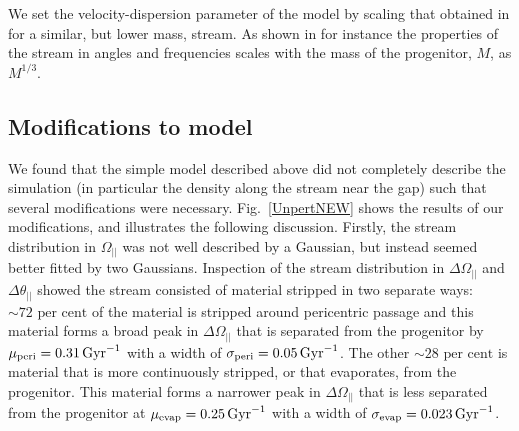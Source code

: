 \documentclass[useAMS,usenatbib,fleqn,a4paper]{mn2e}
\def\Gyr{\,{\rm Gyr}}
\def\percent{\text{ per cent}}
\def\percent{\text{ per cent}}
\begin{document}
We set the velocity-dispersion parameter of the model by scaling that obtained in \cite{Bovy2014} for a similar, but lower mass, stream. As shown in \cite{SandersBinney2013a} for instance the properties of the stream in angles and frequencies scales with the mass of the progenitor, $M$, as $M^{1/3}$.

\subsection{Modifications to model}\label{Sect::modelmods}
We found that the simple model described above did not completely describe the simulation (in particular the density along the stream near the gap) such that several modifications were necessary. Fig.~\ref{UnpertNEW} shows the results of our modifications, and illustrates the following discussion. Firstly, the stream distribution in $\Omega_{||}$ was not well described by a Gaussian, but instead seemed better fitted by two Gaussians. Inspection of the stream distribution in $\Delta\Omega_{||}$ and $\Delta\theta_{||}$ showed the stream consisted of material stripped in two separate ways: $\sim72\percent$ of the material is stripped around pericentric passage and this material forms a broad peak in $\Delta\Omega_{||}$ that is separated from the progenitor by $\mu_\mathrm{peri}=0.31\Gyr^{-1}$ with a width of $\sigma_\mathrm{peri}=0.05\Gyr^{-1}$. The other $\sim28\percent$ is material that is more continuously stripped, or that evaporates, from the progenitor. This material forms a narrower peak in $\Delta\Omega_{||}$ that is less separated from the progenitor at $\mu_\mathrm{evap}=0.25\Gyr^{-1}$ with a width of $\sigma_\mathrm{evap}=0.023\Gyr^{-1}$.
\end{document}
